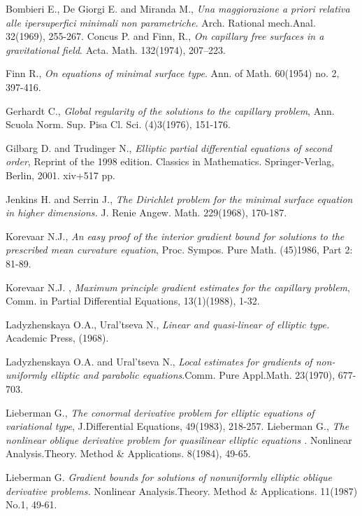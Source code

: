 \documentclass[11pt]{amsart}
\numberwithin{equation}{section}
\begin{document}
\begin{thebibliography}{14}

 Bombieri E., De Giorgi E. and Miranda M., {\em Una maggiorazione a priori relativa alle ipersuperfici minimali non parametriche}. Arch. Rational mech.Anal. 32(1969), 255-267.
 Concus P. and Finn, R., {\em On capillary free surfaces in a gravitational field}. Acta. Math. 132(1974), 207--223.

 Finn R., {\em On equations of minimal surface type}. Ann. of
 Math. 60(1954) no. 2, 397-416.

Gerhardt C., {\em Global regularity of the solutions to the capillary problem}, Ann. Scuola Norm. Sup. Pisa Cl. Sci. (4)3(1976), 151-176.


Gilbarg D. and Trudinger N., {\em Elliptic partial differential equations of second order}, Reprint of the 1998 edition. Classics in Mathematics. Springer-Verlag, Berlin, 2001. xiv+517 pp.


Jenkins H. and  Serrin J., {\em The Dirichlet problem for the minimal surface equation in higher dimensions.}
J. Renie Angew. Math. 229(1968), 170-187.


 Korevaar N.J., {\em An easy proof of the interior gradient bound for  solutions
to the prescribed mean curvature equation}, Proc. Sympos. Pure Math. (45)1986,  Part 2: 81-89.

Korevaar N.J. , {\em Maximum principle gradient estimates for the capillary problem}, Comm. in Partial Differential Equations, 13(1)(1988), 1-32.

 Ladyzhenskaya O.A., Ural'tseva N., {\em Linear and quasi-linear  of  elliptic type.} Academic Press, (1968).

Ladyzhenskaya O.A. and Ural'tseva N., {\em Local estimates for gradients of non-uniformly elliptic and parabolic equations}.Comm.
Pure Appl.Math. 23(1970), 677-703.

Lieberman G., {\em The conormal derivative problem for elliptic equations of variational type}, J.Differential Equations, 49(1983), 218-257.
 Lieberman G., {\em The nonlinear oblique derivative problem for  quasilinear elliptic equations .}
Nonlinear Analysis.Theory. Method \& Applications. 8(1984), 49-65.

 Lieberman G. {\em Gradient bounds for solutions of nonuniformly elliptic oblique  derivative problems.}
Nonlinear Analysis.Theory. Method \& Applications. 11(1987) No.1, 49-61.


\end{thebibliography}
\end{document}
